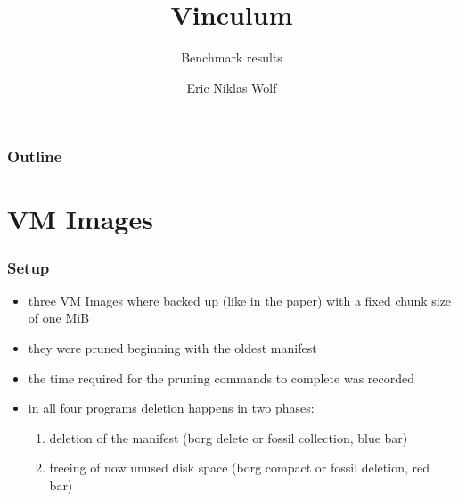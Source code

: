 \documentclass[english,utf8,aspectratio=169]{beamer}
\title{Vinculum}
\subtitle{Benchmark results}
\author{Eric Niklas Wolf}
\begin{document}
    \maketitle

    \begin{frame}
        \frametitle{Outline}
        \tableofcontents
    \end{frame}

    \section{VM Images}
    \begin{frame}
        \frametitle{Setup}
        \begin{itemize}
            \item three VM Images where backed up (like in the paper) with a fixed chunk size of one MiB
            \item they were pruned beginning with the oldest manifest
            \item the time required for the pruning commands to complete was recorded
            \item in all four programs deletion happens in two phases:
            \begin{enumerate}
                \item deletion of the manifest (borg delete or fossil collection, blue bar)
                \item freeing of now unused disk space (borg compact or fossil deletion, red bar)
            \end{enumerate}
        \end{itemize}
    \end{frame}
\end{document}
